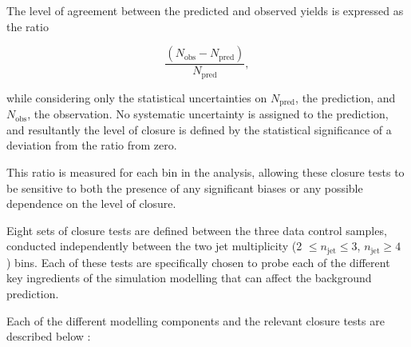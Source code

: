 The level of agreement between the predicted and observed yields is expressed as the ratio 

\begin{equation}
\label{eq:closuretests}
\frac{(N_{\text{obs}}-N_{\text{pred}})}{N_{\text{pred}}},
\end{equation}

while considering only the statistical uncertainties on $N_{\text{pred}}$, the prediction, and $N_{\text{obs}}$, the observation. No systematic uncertainty is assigned to the prediction, and resultantly the level of closure is defined by the statistical significance of a deviation from the ratio from zero.

This ratio is measured for each \theht bin in the analysis, allowing these closure tests to be sensitive to both the presence of any significant biases or any possible \theht dependence on the level of closure.

Eight sets of closure tests are defined between the three data control samples, conducted independently between the two jet multiplicity (2 $\leq n_{\text{jet}} \leq 3$, $n_{\text{jet}} \geq 4$ ) bins. Each of these tests are specifically chosen to probe each of the different key ingredients of the simulation modelling that can affect the background prediction.

Each of the different modelling components and the relevant closure tests are described below :

